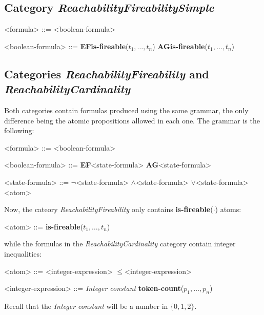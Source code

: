 \documentclass[10pt,english,a4paper]{article}
\newcommand\set[1]           {{\{ #1 \mathclose \}}}
\newcommand\ctla             {\textbf{A}\xspace}
\newcommand\ctle             {\textbf{E}\xspace}
\newcommand\ltlf             {\textbf{F}\xspace}
\newcommand\ltlg             {\textbf{G}\xspace}
\newcommand\logicnot         {\boldmath$\lnot$\xspace}
\newcommand\logicand         {\boldmath$\land$\xspace}
\newcommand\logicor          {\boldmath$\lor$\xspace}
\newcommand\atomleq          {\boldmath$\leq$\xspace}
\newcommand\atomisfire[1]    {\textbf{is-fireable}(#1)}
\newcommand\atomtokenscnt[1] {\textbf{token-count}(#1)}
\begin{document}
\subsection{Category \textit{ReachabilityFireabilitySimple}}

\begin{grammar}

<formula> ::= <boolean-formula> 

<boolean-formula> ::= \ctle \ltlf \atomisfire{$t_1, \ldots, t_n$}
\alt \ctla \ltlg \atomisfire{$t_1, \ldots, t_n$}

\end{grammar}

\subsection{Categories \textit{ReachabilityFireability} and \textit{ReachabilityCardinality}}

Both categories contain formulas produced using the same grammar, the only
difference being the atomic propositions allowed in each one.
The grammar is the following:

\begin{grammar}
<formula> ::= <boolean-formula>

<boolean-formula> ::= \ctle \ltlf <state-formula>
\alt \ctla \ltlg <state-formula>

<state-formula> ::=  \logicnot  <state-formula>
 \logicand <state-formula>
 \logicor  <state-formula>
\alt <atom>
\end{grammar}

Now, the cateory \emph{ReachabilityFireability} only contains
\atomisfire{$\cdot$} atoms:

\begin{grammar}
<atom> ::= \atomisfire{$t_1, \ldots, t_n$}
\end{grammar}

while the formulas in the \emph{ReachabilityCardinality} category contain
integer inequalities:

\begin{grammar}
<atom> ::= <integer-expression> \atomleq <integer-expression>

<integer-expression> ::= \textit{Integer constant}
\alt \atomtokenscnt{$p_1, \ldots, p_n$}
\end{grammar}

Recall that the \textit{Integer constant} will be a number in $\set{0,1,2}$.
\end{document}
